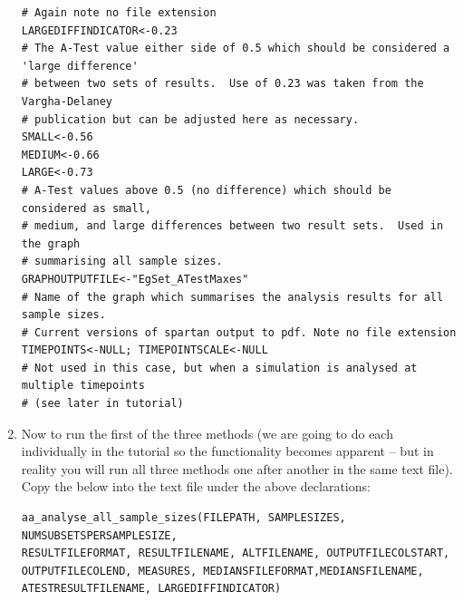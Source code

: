 \documentclass[a4paper,11pt]{article}
\begin{document}
\begin{enumerate}
\begin{verbatim}
# Again note no file extension
LARGEDIFFINDICATOR<-0.23
# The A-Test value either side of 0.5 which should be considered a 'large difference' 
# between two sets of results.  Use of 0.23 was taken from the Vargha-Delaney 
# publication but can be adjusted here as necessary.
SMALL<-0.56
MEDIUM<-0.66
LARGE<-0.73
# A-Test values above 0.5 (no difference) which should be considered as small, 
# medium, and large differences between two result sets.  Used in the graph 
# summarising all sample sizes.
GRAPHOUTPUTFILE<-"EgSet_ATestMaxes"
# Name of the graph which summarises the analysis results for all sample sizes.
# Current versions of spartan output to pdf. Note no file extension
TIMEPOINTS<-NULL; TIMEPOINTSCALE<-NULL
# Not used in this case, but when a simulation is analysed at multiple timepoints 
# (see later in tutorial)

\end{verbatim}

\item Now to run the first of the three methods (we are going to do each individually in the tutorial so the functionality becomes apparent – but in reality you will run all three methods one after another in the same text file). Copy the below into the text file under the above declarations:

\begin{verbatim}
aa_analyse_all_sample_sizes(FILEPATH, SAMPLESIZES, NUMSUBSETSPERSAMPLESIZE,
RESULTFILEFORMAT, RESULTFILENAME, ALTFILENAME, OUTPUTFILECOLSTART, 
OUTPUTFILECOLEND, MEASURES, MEDIANSFILEFORMAT,MEDIANSFILENAME, 
ATESTRESULTFILENAME, LARGEDIFFINDICATOR)
\end{verbatim}


\end{enumerate}
\end{document}
